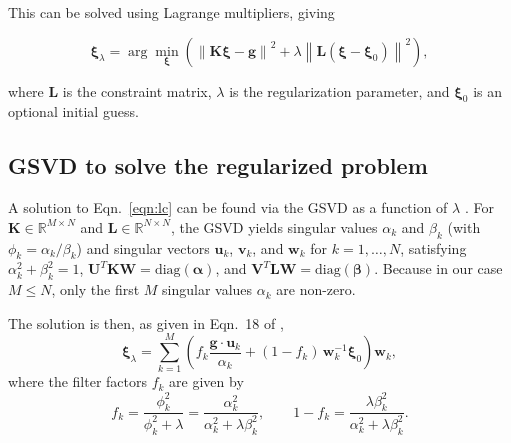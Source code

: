 \documentclass[12pt,a4paper]{article}
\begin{document}
This can be solved using Lagrange multipliers, giving

\begin{equation}\label{eqn:lc}
  \boldsymbol{\xi}_\lambda=\arg\min_{\boldsymbol{\xi}}\left(\left\|\mathbf{K}\boldsymbol{\xi}-\mathbf{g}\right\|^2 +
  \lambda\left\|\mathbf{L}(\boldsymbol{\xi}-\boldsymbol{\xi}_0)\right\|^2\right),
\end{equation}

where $\mathbf{L}$ is the constraint matrix, $\lambda$ is the regularization parameter, and $\boldsymbol{\xi}_0$ is an optional initial guess.

\vspace{-10pt}
\subsection*{GSVD to solve the regularized problem}

A solution to Eqn.~\ref{eqn:lc} can be found via the GSVD as a function of $\lambda$ \citep{1992InvPr...8..849H}. For $\mathbf{K}\in \mathbb{R}^{M\times N}$ and $\mathbf{L}\in \mathbb{R}^{N\times N}$, the GSVD yields singular values $\alpha_k$ and $\beta_k$ (with $\phi_k=\alpha_k/\beta_k$) and singular vectors $\mathbf{u}_k$, $\mathbf{v}_k$, and $\mathbf{w}_k$ for $k=1,\ldots,N$, satisfying
$\alpha_k^2+\beta_k^2=1$, $\mathbf{U}^T\mathbf{K}\mathbf{W}=\mathrm{diag}(\boldsymbol{\alpha})$, and $\mathbf{V}^T\mathbf{L}\mathbf{W}=\mathrm{diag}(\boldsymbol{\beta})$. Because in our case $M \leq N$, only the first $M$ singular values $\alpha_k$ are non-zero.

The solution is then, as given in Eqn.~18 of \citet{1992InvPr...8..849H},
\begin{equation}\label{eqn:sol}
\boldsymbol{\xi}_\lambda = \sum_{k=1}^{M}\left(f_k\frac{\mathbf{g}\cdot \mathbf{u}_k}{\alpha_k}
 +(1-f_k)\,\mathbf{w}_k^{-1}\boldsymbol{\xi}_0 \right)\mathbf{w}_k,
\end{equation}
where the filter factors $f_k$ are given by
\begin{equation}
f_k=\frac{\phi_k^2}{\phi_k^2 +\lambda}=\frac{\alpha_k^2}{\alpha_k^2+\lambda\beta_k^2},
\qquad
1-f_k=\frac{\lambda\beta_k^2}{\alpha_k^2+\lambda\beta_k^2}.
\end{equation}

\end{document}

